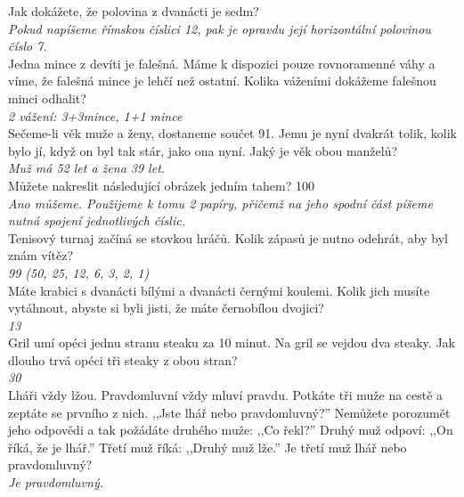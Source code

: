 \begin{multicols}{\value{columnsgames}}
\noindent
Jak dokážete, že polovina z dvanácti je sedm?\\[1 mm]
{\sl Pokud napíšeme římskou číslici 12, pak je opravdu její horizontální 
polovinou číslo 7.}\\

\noindent
Jedna mince z devíti je falešná. Máme k dispozici pouze rovnoramenné 
váhy a víme, že falešná mince je lehčí než ostatní. Kolika váženími 
dokážeme falešnou minci odhalit?\\[1 mm]
{\sl 2 vážení: 3+3mince, 1+1 mince}\\

\noindent
Sečeme-li věk muže a ženy, dostaneme součet 91. Jemu je nyní 
dvakrát tolik, kolik bylo jí, když on byl tak stár, jako ona 
nyní. Jaký je věk obou manželů?\\[1 mm]
{\sl Muž má 52 let a žena 39 let.}\\

\noindent
Můžete nakreslit následující obrázek jedním tahem? 100\\[1 mm]
{\sl Ano můžeme. Použijeme k tomu 2 papíry, přičemž na jeho spodní 
část píšeme nutná spojení jednotlivých číslic.}\\

\noindent
Tenisový turnaj začíná se stovkou hráčů. Kolik zápasů je 
nutno odehrát, aby byl znám vítěz?\\[1 mm]
{\sl 99 (50, 25, 12, 6, 3, 2, 1)}\\

\noindent
Máte krabici s dvanácti bílými a dvanácti černými koulemi. 
Kolik jich musíte vytáhnout, abyste si byli jisti, že máte černobílou 
dvojici?\\[1 mm]
{\sl 13}\\

\noindent
Gril umí opéci jednu stranu steaku za 10 minut. Na gril se 
vejdou dva steaky. Jak dlouho trvá opéci tři steaky z obou
stran?\\[1 mm]
{\sl 30}\\

\noindent
Lháři vždy lžou. Pravdomluvní vždy mluví pravdu. Potkáte 
tři muže na cestě a zeptáte se prvního z nich. ,,Jste lhář nebo 
pravdomluvný?'' Nemůžete porozumět jeho odpovědi a tak požádáte 
druhého muže: ,,Co řekl?'' Druhý muž odpoví: ,,On říká, že je 
lhář.'' Třetí muž říká: ,,Druhý muž lže.'' Je třetí muž lhář 
nebo pravdomluvný?\\[1 mm]
{\sl Je pravdomluvný.}\\


\end{multicols}
